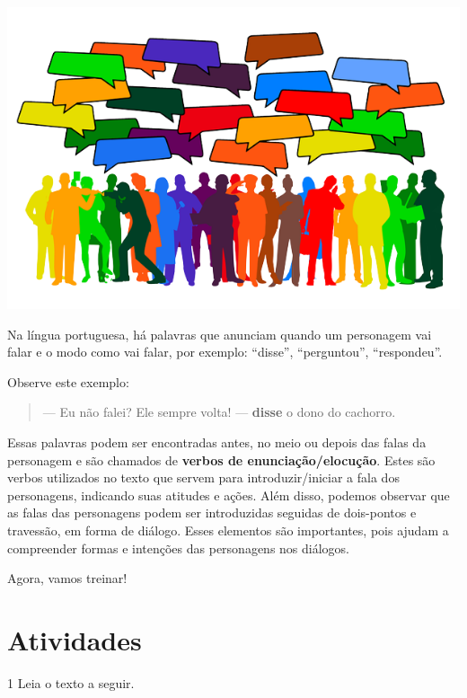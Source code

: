 \begin{conteudo}
\begin{conteudo}
\begin{conteudo}
\begin{conteudo}
{%
\noindent\includegraphics[width=\textwidth]{media/image21.png}

Na língua portuguesa, há palavras que anunciam quando um personagem vai falar e o modo como vai falar, por exemplo: ``disse'', ``perguntou'', ``respondeu''.

Observe este exemplo:

\begin{quote}
--- Eu não falei? Ele sempre volta! --- \textbf{disse} o dono do cachorro.
\end{quote}

Essas palavras podem ser encontradas antes, no meio ou depois das falas
da personagem e são chamados de \textbf{verbos de enunciação/elocução}. 
Estes são verbos utilizados no texto que servem para introduzir/iniciar 
a fala dos personagens, indicando suas atitudes e ações. Além disso, podemos
observar que as falas das personagens podem ser introduzidas
seguidas de dois-pontos e travessão, em forma de diálogo. Esses
elementos são importantes, pois ajudam a compreender formas e intenções
das personagens nos diálogos.

Agora, vamos treinar!
}

\section{Atividades}

\num{1} Leia o texto a seguir.



\end{conteudo}
\end{conteudo}
\end{conteudo}
\end{conteudo}
